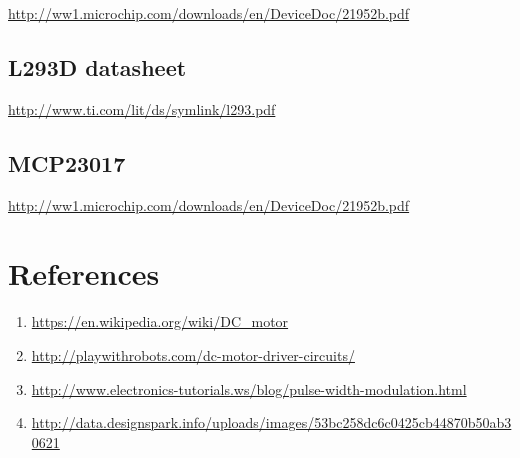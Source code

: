 \documentclass[11pt,a4paper]{article}
\begin{document}
	\url{http://ww1.microchip.com/downloads/en/DeviceDoc/21952b.pdf}
	\subsection{L293D datasheet}
	
	\url{http://www.ti.com/lit/ds/symlink/l293.pdf}
	\subsection{MCP23017}
	\url{http://ww1.microchip.com/downloads/en/DeviceDoc/21952b.pdf}
	
	\section{References}
	\begin{enumerate}
		\item \url{https://en.wikipedia.org/wiki/DC_motor}
		\item \url{http://playwithrobots.com/dc-motor-driver-circuits/}
		\item \url{http://www.electronics-tutorials.ws/blog/pulse-width-modulation.html}
		\item \url{http://data.designspark.info/uploads/images/53bc258dc6c0425cb44870b50ab30621}
	\end{enumerate}
	
\end{document}
